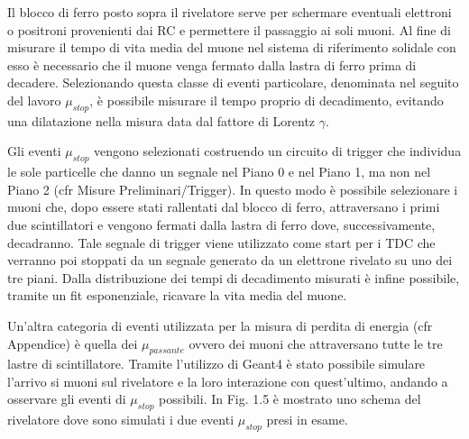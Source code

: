 \documentclass{standalone}
\begin{document}
Il blocco di ferro posto sopra il rivelatore serve per schermare eventuali elettroni o positroni provenienti dai RC e permettere il passaggio ai soli muoni.
Al fine di misurare il tempo di vita media del muone nel sistema di riferimento solidale con esso \`e necessario che il muone venga fermato dalla lastra di ferro prima di decadere. Selezionando questa classe di eventi particolare, denominata nel seguito del lavoro $\mu_{stop}$, \`e possibile misurare il tempo proprio di decadimento, evitando una dilatazione nella misura data dal fattore di Lorentz $\gamma$.

Gli eventi $\mu_{stop}$ vengono selezionati costruendo un circuito di trigger che individua le sole particelle che danno un segnale nel Piano 0 e nel Piano 1, ma non nel Piano 2 (cfr Misure Preliminari/Trigger). In questo modo \`e possibile selezionare i muoni che, dopo essere stati rallentati dal blocco di ferro, attraversano i primi due scintillatori e vengono fermati dalla lastra di ferro dove, successivamente, decadranno.
Tale segnale di trigger viene utilizzato come start per i TDC che verranno poi stoppati da un segnale generato da un elettrone rivelato su uno dei tre piani. Dalla distribuzione dei tempi di decadimento misurati \`e infine possibile, tramite un fit esponenziale, ricavare la vita media del muone.

Un'altra categoria di eventi utilizzata per la misura di perdita di energia (cfr Appendice) \`e quella dei $\mu_{passante}$ ovvero dei muoni che attraversano tutte le tre lastre di scintillatore. Tramite l'utilizzo di Geant4 \`e stato possibile simulare l'arrivo si muoni sul rivelatore e la loro interazione con quest'ultimo, andando a osservare gli eventi di $\mu_{stop}$ possibili. In Fig. 1.5 \`e mostrato uno schema del rivelatore dove sono simulati i due eventi $\mu_{stop}$ presi in esame.
\end{document}
